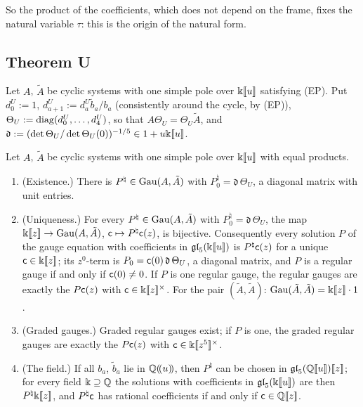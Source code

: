So the product of the coefficients, which does not depend on the frame, fixes the natural variable $\tau$: this is the origin of the natural form.

\subsection{Theorem U}
\label{sec:gau-U}

Let $A$, $\tilde A$ be cyclic systems with one simple pole over $\Bbbk[\![ u ]\!]$ satisfying (EP). Put $d^U_0:=1$, $d^U_{a+1}:=d^U_a\tilde b_a/b_a$ (consistently around the cycle, by (EP)), $\Theta_U:=\operatorname{diag}(d^U_0,\dots,d^U_4)$, so that $A\Theta_U=\Theta_U\tilde A$, and $\mathfrak d:=(\det\Theta_U/\det\Theta_U(0))^{-1/5}\in1+u\Bbbk[\![ u ]\!]$.

\begin{thm}
\label{thm:gau-U}
Let $A$, $\tilde A$ be cyclic systems with one simple pole over $\Bbbk[\![ u ]\!]$ with equal products.
\begin{enumerate}
\item[(a)] (Existence.) There is $P^\natural\in\operatorname{Gau}(A,\tilde A)$ with $P^\natural_0=\mathfrak d\,\Theta_U$, a diagonal matrix with unit entries.
\item[(b)] (Uniqueness.) For every $P^\natural\in\operatorname{Gau}(A,\tilde A)$ with $P^\natural_0=\mathfrak d\,\Theta_U$, the map $\Bbbk[\![ z ]\!]\to\operatorname{Gau}(A,\tilde A)$, $\mathsf{c}\mapsto P^\natural\mathsf{c}(z)$, is bijective. Consequently every solution $P$ of the gauge equation with coefficients in $\mathfrak{gl}_5(\Bbbk[\![ u ]\!])$ is $P^\natural\mathsf{c}(z)$ for a unique $\mathsf{c}\in\Bbbk[\![ z ]\!]$; its $z^0$-term is $P_0=\mathsf{c}(0)\,\mathfrak d\,\Theta_U$, a diagonal matrix, and $P$ is a regular gauge if and only if $\mathsf{c}(0)\neq0$. If $P$ is one regular gauge, the regular gauges are exactly the $P\mathsf{c}(z)$ with $\mathsf{c}\in\Bbbk[\![ z ]\!]^\times$. For the pair $(\tilde A,\tilde A)$: $\operatorname{Gau}(\tilde A,\tilde A)=\Bbbk[\![ z ]\!]\cdot1$.
\item[(c)] (Graded gauges.) Graded regular gauges exist; if $P$ is one, the graded regular gauges are exactly the $P\mathsf{c}(z)$ with $\mathsf{c}\in\Bbbk[\![ z^5 ]\!]^\times$.
\item[(d)] (The field.) If all $b_a$, $\tilde b_a$ lie in $\mathbb{Q}(\!(u)\!)$, then $P^\natural$ can be chosen in $\mathfrak{gl}_5(\mathbb{Q}[\![ u ]\!])[\![ z ]\!]$; for every field $\Bbbk\supseteq\mathbb{Q}$ the solutions with coefficients in $\mathfrak{gl}_5(\Bbbk[\![ u ]\!])$ are then $P^\natural\Bbbk[\![ z ]\!]$, and $P^\natural\mathsf{c}$ has rational coefficients if and only if $\mathsf{c}\in\mathbb{Q}[\![ z ]\!]$.
\end{enumerate}
\end{thm}

